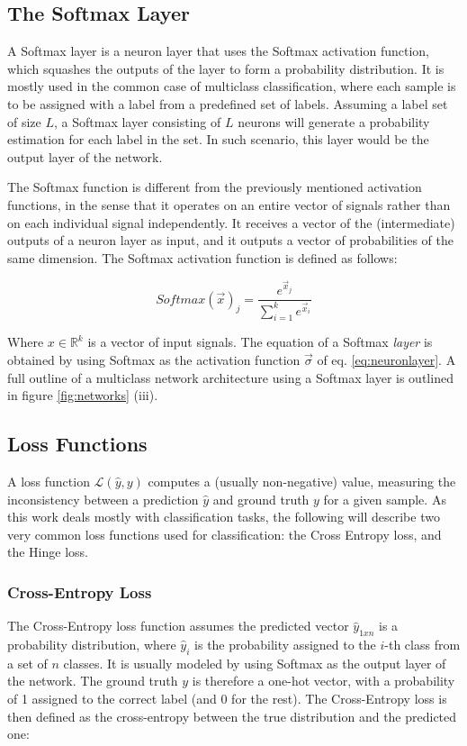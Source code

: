 \subsection{The Softmax Layer}
A Softmax layer is a neuron layer that uses the Softmax activation function, which squashes the outputs of the layer to form a probability distribution. It is mostly used in the common case of multiclass classification, where each sample is to be assigned with a label from a predefined set of labels. Assuming a label set of size $L$, a Softmax layer consisting of $L$ neurons will generate a probability estimation for each label in the set. In such scenario, this layer would be the output layer of the network.

The Softmax function is different from the previously mentioned activation functions, in the sense that it operates on an entire vector of signals rather than on each individual signal independently. It receives a vector of the (intermediate) outputs of a neuron layer as input, and it outputs a vector of probabilities of the same dimension. The Softmax activation function is defined as follows:

\begin{equation}
    Softmax( \vec{x} )_j = \frac{e^{\vec{x}_j}}{\sum_{i=1}^k e^{\vec{x}_i}}
    \label{eq:softmax}
\end{equation}

Where $x \in \mathbb{R}^k$ is a vector of input signals. The equation of a Softmax \emph{layer} is obtained by using Softmax as the activation function \(\vec{\sigma}\) of eq.  \ref{eq:neuronlayer}. A full outline of a multiclass network architecture using a Softmax layer is outlined in figure \ref{fig:networks} (iii).

\subsection{Loss Functions}

A loss function $\mathcal{L}(\hat{y}, y)$ computes a (usually non-negative) value, measuring the inconsistency between a prediction $\hat{y}$ and ground truth $y$ for a given sample. 
As this work deals mostly with classification tasks, the following will describe two very common loss functions used for classification: the Cross Entropy loss, and the Hinge loss.

\subsubsection{Cross-Entropy Loss}
The Cross-Entropy loss function assumes the predicted vector $\hat{y}_{1xn}$ is a probability distribution, where $\hat{y}_i$ is the probability assigned to the $i$-th class from a set of $n$ classes. It is usually modeled by using Softmax as the output layer of the network. The ground truth $y$ is therefore a one-hot vector, with a probability of 1 assigned to the correct label (and 0 for the rest). The Cross-Entropy loss is then defined as the cross-entropy between the true distribution and the predicted one:

